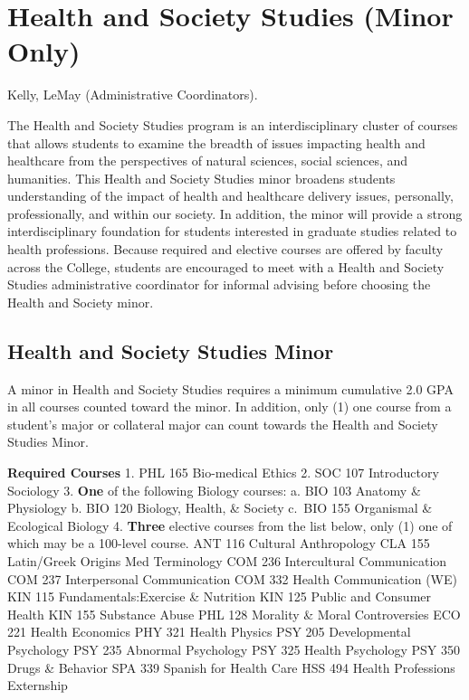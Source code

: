 \documentclass[
  letterpaper,
]{scrbook}
\begin{document}
\section{Health and Society Studies (Minor
Only)}\label{sec-health-and-society-studies}

Kelly, LeMay (Administrative Coordinators).

The Health and Society Studies program is an interdisciplinary cluster
of courses that allows students to examine the breadth of issues
impacting health and healthcare from the perspectives of natural
sciences, social sciences, and humanities. This Health and Society
Studies minor broadens students understanding of the impact of health
and healthcare delivery issues, personally, professionally, and within
our society. In addition, the minor will provide a strong
interdisciplinary foundation for students interested in graduate studies
related to health professions. Because required and elective courses are
offered by faculty across the College, students are encouraged to meet
with a Health and Society Studies administrative coordinator for
informal advising before choosing the Health and Society minor.

\subsection{Health and Society Studies
Minor}\label{health-and-society-studies-minor}

A minor in Health and Society Studies requires a minimum cumulative 2.0
GPA in all courses counted toward the minor. In addition, only (1) one
course from a student's major or collateral major can count towards the
Health and Society Studies Minor.

\textbf{Required Courses} 1. PHL 165 Bio-medical Ethics 2. SOC 107
Introductory Sociology 3. \textbf{One} of the following Biology courses:
a. BIO 103 Anatomy \& Physiology b. BIO 120 Biology, Health, \& Society
c.~BIO 155 Organismal \& Ecological Biology 4. \textbf{Three} elective
courses from the list below, only (1) one of which may be a 100-level
course. ANT 116 Cultural Anthropology CLA 155 Latin/Greek Origins Med
Terminology COM 236 Intercultural Communication COM 237 Interpersonal
Communication COM 332 Health Communication (WE) KIN 115
Fundamentals:Exercise \& Nutrition KIN 125 Public and Consumer Health
KIN 155 Substance Abuse PHL 128 Morality \& Moral Controversies ECO 221
Health Economics PHY 321 Health Physics PSY 205 Developmental Psychology
PSY 235 Abnormal Psychology PSY 325 Health Psychology PSY 350 Drugs \&
Behavior SPA 339 Spanish for Health Care HSS 494 Health Professions
Externship
\end{document}
